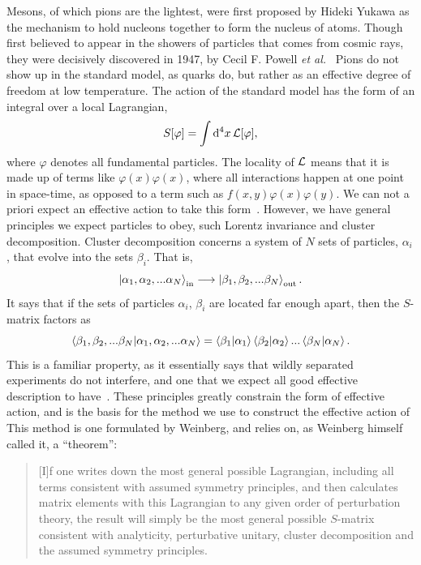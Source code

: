 Mesons, of which pions are the lightest, were first proposed by Hideki Yukawa as the mechanism to hold nucleons together to form the nucleus of atoms.
Though first believed to appear in the showers of particles that comes from cosmic rays, they were decisively discovered in 1947, by Cecil F. Powell \emph{et al.}~\cite{griffiths:introduction}
Pions do not show up in the standard model, as quarks do, but rather as an effective degree of freedom at low temperature.
The action of the standard model has the form of an integral over a local Lagrangian,
\begin{equation}
    S[\varphi] = \int \dd^4 x \, \mathcal{L}[\varphi],
\end{equation}
where $\varphi$ denotes all fundamental particles.
The locality of $\mathcal{L}$ means that it is made up of terms like $\varphi(x) \varphi(x)$, where all interactions happen at one point in space-time, as opposed to a term such as $f(x, y)\varphi(x) \varphi(y)$.
We can not a priori expect an effective action to take this form~\cite{Schwartz:QFT}.
However, we have general principles we expect particles to obey, such Lorentz invariance and cluster decomposition.
Cluster decomposition concerns a system of $N$ sets of particles, $\alpha_i$, that evolve into the sets $\beta_i$.
That is,
\begin{equation}
    \ket{\alpha_1, \alpha_2, ... \alpha_N}_\text{in}
    \longrightarrow
    \ket{\beta_1, \beta_2, ... \beta_N}_\text{out}.
\end{equation}
It says that if the sets of particles $\alpha_i$, $\beta_i$ are located far enough apart, then the $S$-matrix factors as
\begin{equation}
    {\braket{\beta_1, \beta_2, ... \beta_N}{\alpha_1, \alpha_2, ... \alpha_N}}
    =
    \braket{\beta_1}{\alpha_1}\braket{\beta_2}{\alpha_2}... \braket{\beta_N}{\alpha_N}.
\end{equation}
This is a familiar property, as it essentially says that wildly separated experiments do not interfere, and one that we expect all good effective description to have~\cite{weinberg_1995,weinberg_1996_vol2}.
These principles greatly constrain the form of effective action, and is the basis for the method we use to construct the effective action of \chpt 
This method is one formulated by Weinberg, and relies on, as Weinberg himself called it, a ``theorem'':
\begin{quote}
    [I]f one writes down the most general possible Lagrangian, including all terms consistent with assumed symmetry principles, and then calculates matrix elements with this Lagrangian to any given order of perturbation theory, the result will simply be the most general possible $S$-matrix consistent with analyticity, perturbative unitary, cluster decomposition and the assumed symmetry principles. \cite{WeinbergPhenom}
\end{quote}
